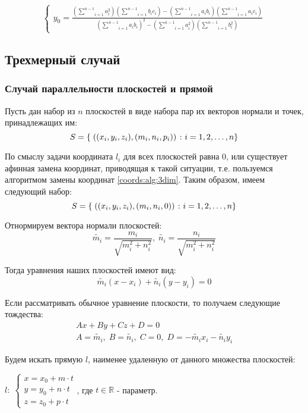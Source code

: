 \begin{itemize}
$$\begin{cases}
		y_0 = \frac{\left( \underset{i=1}{\overset{n-1}{\sum}} a_i^2 \right) \left( \underset{i=1}{\overset{n-1}{\sum}} b_i c_i \right) - \left( \underset{i=1}{\overset{n-1}{\sum}} a_i b_i \right) \left( \underset{i=1}{\overset{n-1}{\sum}} a_i c_i \right)}{\left( \underset{i=1}{\overset{n-1}{\sum}} a_i b_i \right)^2 - \left( \underset{i=1}{\overset{n-1}{\sum}} a_i^2 \right)\left( \underset{i=1}{\overset{n-1}{\sum}} b_i^2 \right)}
	\end{cases}$$
 \end{itemize}

\newpage
\subsection{Трехмерный случай}\label{plane:alg:3dim}

\subsubsection{Случай параллельности плоскостей и прямой}\label{plane:alg:3dim:paral}

Пусть дан набор из $n$ плоскостей в виде набора пар их векторов нормали и точек, принадлежащих им: 
$$S = \left\{\;((x_i, y_i, z_i), (m_i, n_i, p_i))\;\colon i = 1,2,\dots,n\right\}$$

По смыслу задачи координата $l_i$ для всех плоскостей равна 0, или существует афинная замена координат, приводящая к такой ситуации, т.е. пользуемся алгоритмом замены координат \ref{coords:alg:3dim}. Таким образом, имеем следующий набор:
$$S = \left\{\;((x_i, y_i, z_i), (m_i, n_i, 0))\;\colon i = 1,2,\dots,n\right\}$$

Отнормируем вектора нормали плоскостей:
$$\tilde{m_i} = \frac{m_i}{\sqrt{m_i^2+n_i^2}}, \; \tilde{n_i} = \frac{n_i}{\sqrt{m_i^2+n_i^2}}$$

Тогда уравнения наших плоскостей имеют вид:
$$\tilde{m_i} (x - x_i) + \tilde{n_i} (y - y_i) = 0$$

Если рассматривать обычное уравнение плоскости, то получаем следующие тождества:
$$\begin{gathered}
	A x + B y + C z + D = 0 \\
	A = \tilde{m_i}, \; B = \tilde{n_i}, \; C = 0, \; D = -\tilde{m_i} x_i - \tilde{n_i} y_i
\end{gathered}$$

Будем искать прямую $l$, наименее удаленную от данного множества плоскостей:
\begin{center}
	$\mathit{l}: \; \begin{cases}
		x = x_0 + m \cdot t \\
		y = y_0 + n \cdot t \\
		z = z_0 + p \cdot t
	\end{cases}$, где $t \in \mathbb{R}$ - параметр. 
\end{center}

